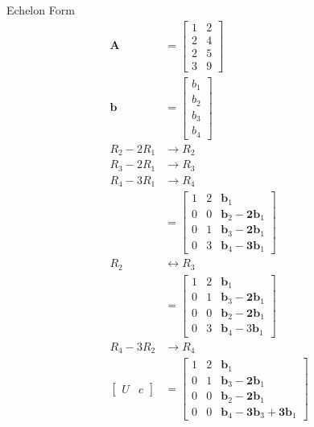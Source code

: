 \documentclass[main.tex]{subfiles}
\begin{document}
\begin{enumerate}
    Echelon Form
    $$
    \begin{aligned}
    \boldsymbol{A} &= \left[\begin{array}{ll}
    1 & 2 \\
    2 & 4 \\
    2 & 5 \\
    3 & 9
    \end{array}\right] \\
    \boldsymbol{b} &= \left[\begin{array}{l}
    b_{1} \\
    b_{2} \\
    b_{3} \\
    b_{4}
    \end{array}\right]\\
    R_2 - 2R_1 &\rightarrow R_2\\
    R_3 - 2R_1 &\rightarrow R_3\\
    R_4 - 3R_1 &\rightarrow R_4\\
    &=\left[\begin{array}{ccc}
    1 & 2 & \mathbf{b}_{1} \\
    0 & 0 & \mathbf{b}_{2}-\mathbf{2} \mathbf{b}_{1} \\
    0 & 1 & \mathbf{b}_{3}-\mathbf{2} \mathbf{b}_{1} \\
    0 & 3 & \mathbf{b}_{4}-\mathbf{3} \mathbf{b}_{1}
    \end{array}\right]\\
    R_2 &\leftrightarrow R_3\\
    &=\left[\begin{array}{ccc}
    1 & 2 & \mathbf{b}_{1} \\
    0 & 1 & \mathbf{b}_{3}-\mathbf{2} \mathbf{b}_{1} \\
    0 & 0 & \mathbf{b}_{2}-\mathbf{2} \mathbf{b}_{1} \\
    0 & 3 & \mathbf{b}_{4}-3 \mathbf{b}_{1}
    \end{array}\right]\\
    R_4 - 3R_2 &\rightarrow R_4\\
    \left[\begin{array}{ll}
    U & c
    \end{array}\right] &= \left[\begin{array}{ccc}
    1 & 2 & \mathbf{b}_{1} \\
    0 & 1 & \mathbf{b}_{3}-\mathbf{2} \mathbf{b}_{1} \\
    0 & 0 & \mathbf{b}_{2}-\mathbf{2} \mathbf{b}_{1} \\
    0 & 0 & \mathbf{b}_{4}-\mathbf{3} \mathbf{b}_{3}+\mathbf{3} \mathbf{b}_{1}
    \end{array}\right]
    \end{aligned}
    $$
    

\end{enumerate}
\end{document}
